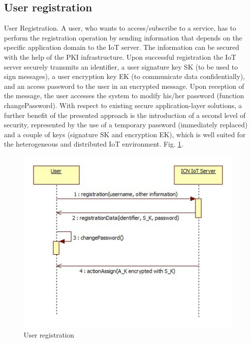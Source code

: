 \subsection{User registration}
User Registration.
 A user, who wants to access/subscribe to a service, has to perform the registration operation by sending information that depends on the specific application domain to the IoT server. The information can be secured with the help of the PKI infrastructure. Upon successful registration the IoT server securely transmits an identifier, a user signature key SK (to be used to sign messages), a user encryption key EK (to communicate data confidentially), and an access password to the user in an encrypted message. Upon reception of the message, the user accesses the system to modify his/her password (function changePassword). With respect to existing secure application-layer solutions, a further benefit of the presented approach is the introduction of a second level of security, represented by the use of a temporary password (immediately replaced) and a couple of keys (signature SK and encryption EK), which is well suited for the heterogeneous and distributed IoT environment.
Fig. \ref{fig:User registration}.
 \begin{figure}[h]
	\centering
	\includegraphics[width=0.8\linewidth]{Figures/User-registration-secure-subscribe.png}
	\caption[]{User registration}
	\label{fig:User registration}
\end{figure}
\par
